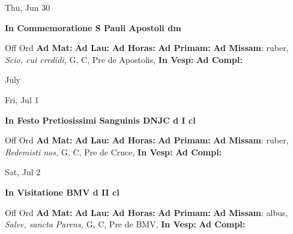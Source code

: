 \documentclass[10pt]{memoir}
\begin{document}
\begin{center}
\begin{minipage}{3.5in}
\vspace{2em}
\begin{center}Thu, Jun 30
\end{center}
\textbf{ \large In Commemoratione S Pauli Apostoli
\textnormal{\normalsize dm}}

\begin{justify}Off Ord
\textbf{Ad Mat: }
\textbf{Ad Lau: }
\textbf{Ad Horas: }
\textbf{Ad Primam: }\textbf{Ad Missam}: ruber, \textit{Scio, cui credidi,} G, C, Pre de Apostolis, 
\textbf{In Vesp: }
\textbf{Ad Compl: }
\end{justify}
\end{minipage}
\end{center}

\begin{center}
\pagebreak
\thispagestyle{empty}
{\Huge July}
\end{center}
                    
\begin{center}
\begin{minipage}{3.5in}
\vspace{2em}
\begin{center}Fri, Jul 1
\end{center}
\textbf{ \large In Festo Pretiosissimi Sanguinis DNJC
\textnormal{\normalsize d I cl}}

\begin{justify}Off Ord
\textbf{Ad Mat: }
\textbf{Ad Lau: }
\textbf{Ad Horas: }
\textbf{Ad Primam: }\textbf{Ad Missam}: ruber, \textit{Redemisti nos,} G, C, Pre de Cruce, 
\textbf{In Vesp: }
\textbf{Ad Compl: }
\end{justify}
\end{minipage}
\end{center}

\begin{center}
\begin{minipage}{3.5in}
\vspace{2em}
\begin{center}Sat, Jul 2
\end{center}
\textbf{ \large In Visitatione BMV
\textnormal{\normalsize d II cl}}

\begin{justify}Off Ord
\textbf{Ad Mat: }
\textbf{Ad Lau: }
\textbf{Ad Horas: }
\textbf{Ad Primam: }\textbf{Ad Missam}: albus, \textit{Salve, sancta Parens,} G, C, Pre de BMV, 
\textbf{In Vesp: }
\textbf{Ad Compl: }
\end{justify}
\end{minipage}
\end{center}
\end{document}
